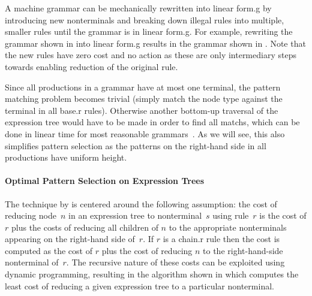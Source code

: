 A \gls{machine grammar} can be mechanically rewritten into \gls{linear form.g}
by introducing new \glspl{nonterminal} and breaking down illegal \glspl{rule}
into multiple, smaller \glspl{rule} until the \gls{grammar} is in \gls{linear
  form.g}.
%
For example, rewriting the \gls{grammar} shown in
 into \gls{linear form.g} results in the
\gls{grammar} shown in .
%
Note that the new \glspl{rule} have zero cost and no action as these are only
intermediary steps towards enabling reduction of the original \gls{rule}.

Since all \glspl{production} in a  \gls{grammar} have at
most one \gls{terminal}, the \gls{pattern matching} problem becomes trivial
(simply match the node type against the \gls{terminal} in all \gls{base.r}
\glspl{rule}).
%
Otherwise another bottom-up traversal of the \gls{expression tree} would have to
be made in order to find all \glspl{match}, which can be done in linear time for
most reasonable \glspl{grammar}~\cite{HoffmannODonnell:1982}.
%
As we will see, this also simplifies \gls{pattern selection} as the
\glspl{pattern} on the right-hand side in all \glspl{production} have uniform
height.



\paragraph{Optimal Pattern Selection on Expression Trees}

The technique by \citeauthor{AhoEtAl:1989} is centered around the following
assumption: the cost of reducing node~$n$ in an \gls{expression tree} to
\gls{nonterminal}~$s$ using \gls{rule}~$r$ is the cost of $r$ plus the costs of
reducing all children of $n$ to the appropriate \glspl{nonterminal} appearing on
the right-hand side of~$r$.
%
If $r$ is a \gls{chain.r} \gls{rule} then the cost is computed as the cost of
$r$ plus the cost of reducing $n$ to the right-hand-side \gls{nonterminal}
of~$r$.
%
The recursive nature of these costs can be exploited using dynamic programming,
resulting in the algorithm shown in  which
computes the least cost of reducing a given \gls{expression tree} to a
particular \gls{nonterminal}.

